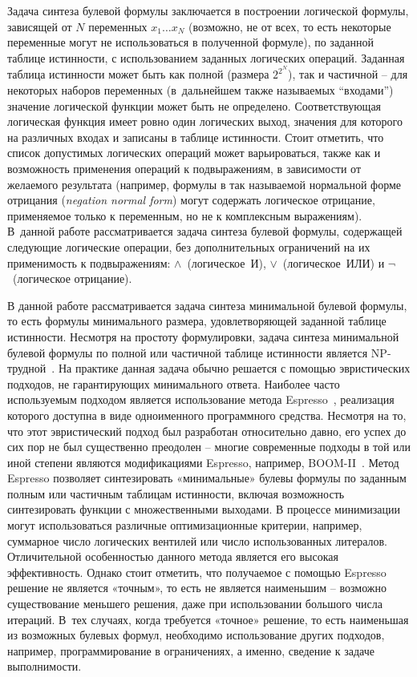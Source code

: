 Задача синтеза булевой формулы заключается в построении логической формулы, зависящей от $N$ переменных $x_{1}\ldots x_{N}$ (возможно, не от всех, то есть некоторые переменные могут не использоваться в полученной формуле), по заданной таблице истинности, с использованием заданных логических операций.
Заданная таблица истинности может быть как полной (размера $2^{2^{N}}$), так и частичной \--- для некоторых наборов переменных (в~дальнейшем также называемых \enquote{входами}) значение логической функции может быть не определено.
Соответствующая логическая функция имеет ровно один логических выход, значения для которого на различных входах и записаны в таблице истинности.
Стоит отметить, что список допустимых логических операций может варьироваться, также как и возможность применения операций к подвыражениям, в зависимости от желаемого результата (например, формулы в так называемой нормальной форме отрицания (\textit{negation normal form}) могут содержать логическое отрицание, применяемое только к переменным, но не к комплексным выражениям).
В~данной работе рассматривается задача синтеза булевой формулы, содержащей следующие логические операции, без дополнительных ограничений на их применимость к подвыражениям: $\land$~(логическое~И), $\lor$~(логическое~ИЛИ) и $\neg$~(логическое отрицание).

В данной работе рассматривается задача синтеза минимальной булевой формулы, то есть формулы минимального размера, удовлетворяющей заданной таблице истинности.
Несмотря на простоту формулировки, задача синтеза минимальной булевой формулы по полной или частичной таблице истинности является NP-трудной~\cite{akshay2018}.
На практике данная задача обычно решается с помощью эвристических подходов, не гарантирующих минимального ответа.
Наиболее часто используемым подходом является использование метода Espresso~\cite{brayton1984}, реализация которого доступна в виде одноименного программного средства.
Несмотря на то, что этот эвристический подход был разработан относительно давно, его успех до сих пор не был существенно преодолен \--- многие современные подходы в той или иной степени являются модификациями Espresso, например, BOOM-II~\cite{fiser2006}.
Метод Espresso позволяет синтезировать «минимальные» булевы формулы по заданным полным или частичным таблицам истинности, включая возможность синтезировать функции с множественными выходами.
В процессе минимизации могут использоваться различные оптимизационные критерии, например, суммарное число логических вентилей или число использованных литералов.
Отличительной особенностью данного метода является его высокая эффективность.
Однако стоит отметить, что получаемое с помощью Espresso решение не является «точным», то есть не является наименьшим \--- возможно существование меньшего решения, даже при использовании большого числа итераций.
В~тех случаях, когда требуется «точное» решение, то есть наименьшая из возможных булевых формул, необходимо использование других подходов, например, программирование в ограничениях, а именно, сведение к задаче выполнимости.

